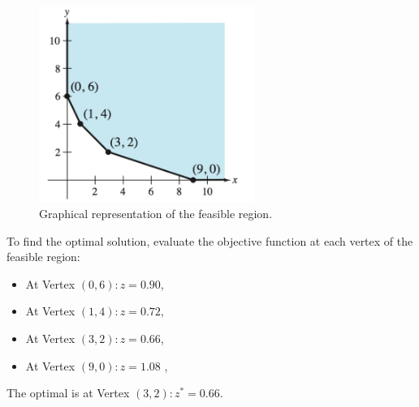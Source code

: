 \documentclass[unicode,11pt,a4paper,oneside,numbers=endperiod,openany]{scrartcl}
\begin{document}
\begin{figure}[H]
    \centering
    \includegraphics[trim=0cm 0cm 0cm 0cm, clip, width=7cm]{img13.png}
    \caption{Graphical representation of the feasible region.}
    \label{fig:img13}
\end{figure}

To find the optimal solution, evaluate the objective function at each vertex of the feasible region:

\begin{itemize}
    \item At Vertex $(0,6): z=0.90$,
    \item At Vertex $(1,4): z=0.72$,
    \item At Vertex $(3,2): z=0.66$,
    \item At Vertex $(9,0): z=1.08$ ,
\end{itemize}
    The optimal is at Vertex $(3,2): z^*=0.66$.
\end{document}
